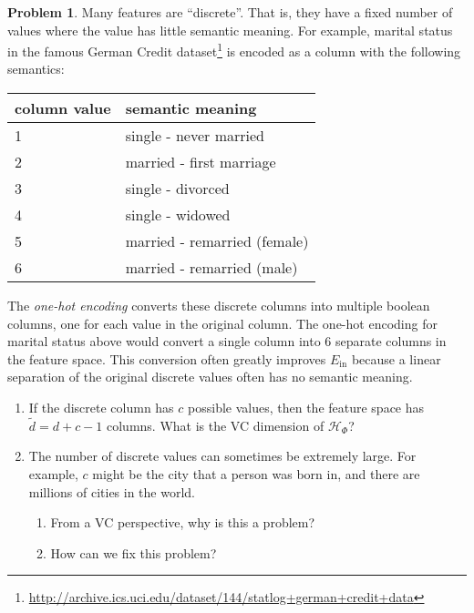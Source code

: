 \documentclass[10pt]{exam}
\theoremstyle{definition}
\newtheorem{problem}{Problem}
\newcommand{\Ein}{E_{\text{in}}}
\newcommand{\HH}[1]{\mathcal H_{\text{#1}}}
\begin{document}
\begin{problem}
    Many features are ``discrete''.
    That is, they have a fixed number of values where the value has little semantic meaning.
    For example, marital status in the famous German Credit dataset\footnote{\url{http://archive.ics.uci.edu/dataset/144/statlog+german+credit+data}} is encoded as a column with the following semantics:

    \vspace{0.15in}
    \begin{tabular}{ll}
        \toprule
        column value & semantic meaning \\
        \midrule
        1 & single - never married \\
        2 & married - first marriage \\
        3 & single - divorced \\
        4 & single - widowed \\
        5 & married - remarried (female) \\ 
        6 & married - remarried (male) \\ 
        \bottomrule
    \end{tabular}

    \vspace{0.15in}
    \noindent
    The \emph{one-hot encoding} converts these discrete columns into multiple boolean columns, one for each value in the original column.
    The one-hot encoding for marital status above would convert a single column into 6 separate columns in the feature space.
    This conversion often greatly improves $\Ein$ because a linear separation of the original discrete values often has no semantic meaning.
    \begin{enumerate}
        \item 
            If the discrete column has $c$ possible values,
            then the feature space has $	\tilde d = d + c - 1$ columns.
            What is the VC dimension of $\HH{$\Phi$}$?
            \vspace{1.5in}

        \item
            The number of discrete values can sometimes be extremely large.
            For example, $c$ might be the city that a person was born in, and there are millions of cities in the world.
            \begin{enumerate}
            \item From a VC perspective, why is this a problem?
                \vspace{1.5in}
            \item How can we fix this problem?
            \end{enumerate}
    \end{enumerate}
\end{problem}
\end{document}
